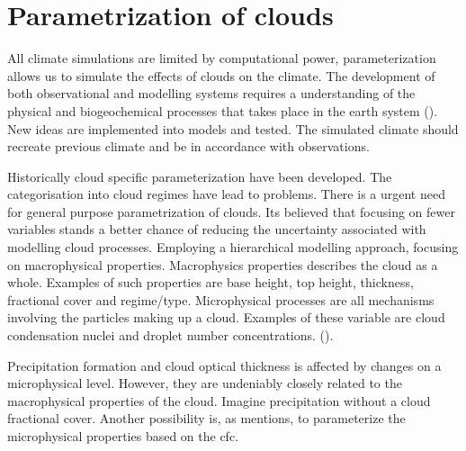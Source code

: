 \section{Parametrization of clouds} \label{sec:param_clouds}

All climate simulations are limited by computational power, parameterization allows us to simulate the effects of clouds on the climate. The development of both observational and modelling systems requires a understanding of the physical and biogeochemical processes that takes place in the earth system (\cite{Simmons2016Observation2016-2025}). New ideas are implemented into models and tested. The simulated climate should recreate previous climate and be in accordance with observations. 

Historically cloud specific parameterization have been developed. The categorisation into cloud regimes have lead to problems. There is a urgent need for general purpose parametrization of clouds. Its believed that focusing on fewer variables stands a better chance of reducing the uncertainty associated with modelling cloud processes. Employing a hierarchical modelling approach, focusing on macrophysical properties. Macrophysics properties describes the cloud as a whole. Examples of such properties are base height, top height, thickness, fractional cover and regime/type. Microphysical processes are all mechanisms involving the particles making up a cloud. Examples of these variable are cloud condensation nuclei and droplet number concentrations. (\cite{Grabowski2019ModelingBetter}).

Precipitation formation and cloud optical thickness is affected by changes on a microphysical level. However, they are undeniably closely related to the macrophysical properties of the cloud. Imagine precipitation without a cloud fractional cover. Another possibility is, as \cite{Fowler1996LiquidAssumptions} mentions, to parameterize the microphysical properties based on the \acrshort{cfc}.


